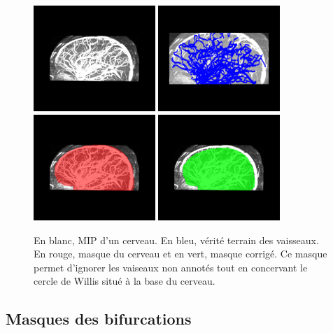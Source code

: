 \begin{figure}[!ht]
  \centering
  \includegraphics[height=4cm]{Images/bullitt_brain.png}
  \includegraphics[height=4cm]{Images/bullitt_gt.png}
  \includegraphics[height=4cm]{Images/bullitt_brainMask.png}
  \includegraphics[height=4cm]{Images/bullitt_brainMask_ok.png}
  \caption{En blanc, MIP d'un cerveau. En bleu, vérité terrain des vaisseaux. En rouge, masque du cerveau et en vert, masque corrigé. Ce masque permet d'ignorer les vaiseaux non annotés tout en concervant le cercle de Willis situé à la base du cerveau.}
  \label{fig:masques_Bullitt}
\end{figure}

\subsection{Masques des bifurcations}

